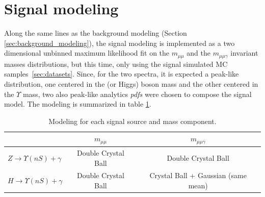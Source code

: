 \clearpage
\section{Signal modeling}

Along the same lines as the background modeling (Section \ref{sec:background_modeling}), the signal modeling is implemented as a two dimensional unbinned maximum likelihood fit on the $m_{\mu\mu}$ and the $m_{\mu\mu\gamma}$ invariant masses distributions, but this time, only using the signal simulated MC samples~\ref{sec:datasets}. Since, for the two spectra, it is expected a peak-like distribution, one centered in the \Z (or Higgs) boson mass and the other centered in the $\Upsilon$ mass, two also peak-like analytics \textit{pdfs} were chosen to compose the signal model. The modeling is summarized in table \ref{tab:SignalModeling}.





\begin{table}[ht]
\begin{center}
\caption{Modeling for each signal source and mass component.}
\begin{tabular}{l|c|c}
                         & \boldmath$m_{\mu\mu}$                                          & \boldmath$m_{\mu\mu\gamma}$       \\ \hline 
\textbf{\boldmath$Z \rightarrow \Upsilon(nS) +\gamma$}       & Double Crystal Ball & Double Crystal Ball      \\ \hline
\textbf{\boldmath$H \rightarrow \Upsilon(nS) +\gamma$} & Double Crystal Ball & Crystal Ball + Gaussian (same mean)  \\ 
\end{tabular}

\label{tab:SignalModeling}
\end{center}
\end{table}




